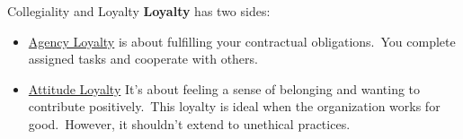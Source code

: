 \documentclass[11pt]{beamer}
\begin{document}
\begin{frame}[t,allowframebreaks]{Collegiality and Loyalty}
        \textbf{Loyalty} has two sides:\\[5pt]
        \begin{itemize}
            \item \ul{Agency Loyalty} is about fulfilling your contractual obligations.\ You complete assigned
            tasks and
            cooperate with others.
            \item \ul{Attitude Loyalty} It's about feeling a sense of belonging and wanting to contribute
            positively.\ This loyalty is ideal when the organization works for good.\ However, it shouldn't extend to
            unethical practices.
        \end{itemize}
%
%
    \end{frame}
\end{document}
